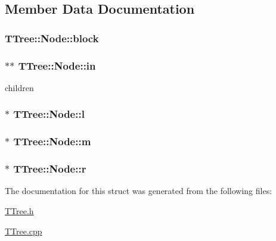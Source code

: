 \subsection{Member Data Documentation}
\hypertarget{structTTree_1_1Node_a100664635a89fa354373102768bd22be}{}
\subsubsection[{block}]{ T\+Tree\+::\+Node\+::block}\label{structTTree_1_1Node_a100664635a89fa354373102768bd22be}
\hypertarget{structTTree_1_1Node_ab126c67191b7e91a1eccc18a3eeadf0b}{}
\subsubsection[{in}]{$\ast$$\ast$ T\+Tree\+::\+Node\+::in}\label{structTTree_1_1Node_ab126c67191b7e91a1eccc18a3eeadf0b}


children 

\hypertarget{structTTree_1_1Node_a78f1bf067928d0e0106e1187364cc69e}{}
\subsubsection[{l}]{$\ast$ T\+Tree\+::\+Node\+::l}\label{structTTree_1_1Node_a78f1bf067928d0e0106e1187364cc69e}
\hypertarget{structTTree_1_1Node_a3f47f1068b4631b1d9eddea0300c6bee}{}
\subsubsection[{m}]{ $\ast$ T\+Tree\+::\+Node\+::m}\label{structTTree_1_1Node_a3f47f1068b4631b1d9eddea0300c6bee}
\hypertarget{structTTree_1_1Node_adb67ed846e6787b3ff26bbcee11ee4b6}{}
\subsubsection[{r}]{ $\ast$ T\+Tree\+::\+Node\+::r}\label{structTTree_1_1Node_adb67ed846e6787b3ff26bbcee11ee4b6}


The documentation for this struct was generated from the following files\+:\begin{DoxyCompactItemize}
\item 
\hyperlink{TTree_8h}{T\+Tree.\+h}\item 
\hyperlink{TTree_8cpp}{T\+Tree.\+cpp}\end{DoxyCompactItemize}
